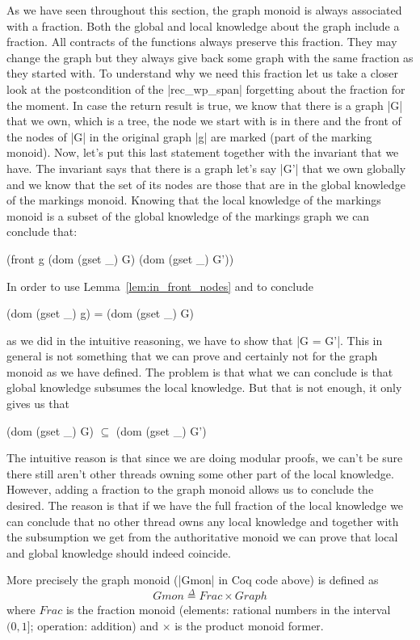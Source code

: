 \documentclass[]{scrartcl}
\newcommand{\defeq}{\overset{\Delta}{=}}
\newcommand{\Frac}{\mathit{Frac}}
\begin{document}
As we have seen throughout this section, the graph monoid is always
associated with a fraction.
Both the global and local knowledge about the graph include a fraction.
All contracts of the functions always preserve this fraction.
They may change the graph but they always give back some graph with
the same fraction as they started with.
To understand why we need this fraction let us take a closer look at the
postcondition of the \Coqe|rec_wp_span| forgetting about the fraction for
the moment.
In case the return result is true, we know that there is a graph \Coqe|G|
that we own, which is a tree, the node we start with is in there and
the front of the nodes of \Coqe|G| in the original graph \Coqe|g| are marked (part of the marking monoid).
Now, let's put this last statement together with the invariant that we have.
The invariant says that there is a graph let's say \Coqe|G'| that we own
globally and we know that the set of its nodes are those that are
in the global knowledge of the markings monoid.
Knowing that the local knowledge of the markings monoid is a subset of
the global knowledge of the markings graph we can conclude that:
\begin{Coq}
(front g (dom (gset _) G) (dom (gset _) G'))
\end{Coq}
In order to use Lemma~\ref{lem:in_front_nodes} and to conclude
\begin{Coq}
(dom (gset _) g) = (dom (gset _) G)
\end{Coq}
as we did in the intuitive reasoning, we have to show that \Coqe|G = G'|.
This in general is not something that we can prove and certainly not for
the graph monoid as we have defined.
The problem is that what we can conclude is that global knowledge
subsumes the local knowledge.
But that is not enough, it only gives us that 
\begin{Coq}
(dom (gset _) G) $\subseteq$ (dom (gset _) G')
\end{Coq}
The intuitive reason is that since we are doing modular proofs, we can't
be sure there still aren't other threads owning some other part of the
local knowledge.
However, adding a fraction to the graph monoid allows us to conclude
the desired.
The reason is that if we have the full fraction of the local knowledge
we can conclude that no other thread owns any local knowledge and
together with the subsumption we get from the authoritative monoid
we can prove that local and global knowledge should indeed coincide.

More precisely the graph monoid (\Coqe|Gmon| in Coq code above) is defined as
\[
\mathit{Gmon} \defeq \Frac \times \mathit{Graph}
\]
where $\Frac$ is the fraction monoid (elements: rational numbers in the interval $(0, 1]$; operation:  addition) and $\times$ is the product monoid former.
\end{document}
